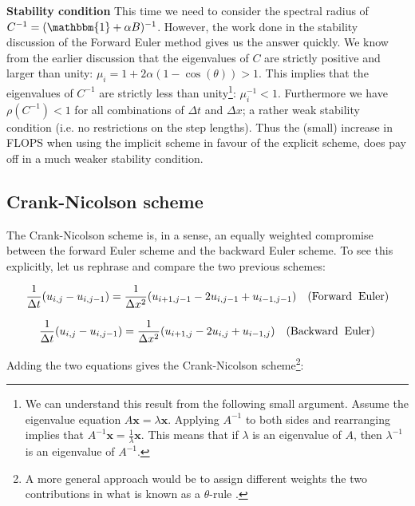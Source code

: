\documentclass[a4paper, 11pt, notitlepage,english]{article}
\newcommand{\id}{\mathbbm{1}}
\begin{document}
\textbf{Stability condition} \newline
This time we need to consider the spectral radius of $C^{-1} = (\id + \alpha B)^{-1}$. However, the work done in the stability discussion of the Forward Euler method gives us the answer quickly. We know from the earlier discussion that the eigenvalues of $C$ are strictly positive and larger than unity: $\mu_i = 1 + 2\alpha(1-\cos(\theta)) > 1$. This implies that the eigenvalues of $C^{-1}$ are strictly less than unity\footnote{We can understand this result from the following small argument. Assume the eigenvalue equation $A\boldsymbol{x} = \lambda \boldsymbol{x}$. Applying $A^{-1}$ to both sides and rearranging implies that $A^{-1}\boldsymbol{x} = \frac{1}{\lambda} \boldsymbol{x}$. This means that if $\lambda$ is an eigenvalue of $A$, then $\lambda^{-1}$ is an eigenvalue of $A^{-1}$.}: $\mu_i^{-1} < 1$. Furthermore we have $\rho(C^{-1}) < 1$ for all combinations of $\Delta t$ and $\Delta x$; a rather weak stability condition (i.e. no restrictions on the step lengths). Thus the (small) increase in FLOPS when using the implicit scheme in favour of the explicit scheme, does pay off in a much weaker stability condition.

\subsection{Crank-Nicolson scheme}
The Crank-Nicolson scheme is, in a sense, an equally weighted compromise between the forward Euler scheme and the backward Euler scheme. To see this explicitly, let us rephrase and compare the two previous schemes:

\begin{equation}
 \frac{1}{\Delta t} (u_{i,j}-u_{i,j-1}) = \frac{1}{\Delta x^2} (u_{i+1,j-1}-2u_{i,j-1}+u_{i-1,j-1}) \hspace{10pt} \mathrm{(Forward \hspace{2mm} Euler)}
\end{equation}

\begin{equation}
 \frac{1}{\Delta t} (u_{i,j}-u_{i,j-1}) = \frac{1}{\Delta x^2} (u_{i+1,j}-2u_{i,j}+u_{i-1,j}) \hspace{10pt} \mathrm{(Backward \hspace{2mm} Euler)}
\end{equation}

Adding the two equations gives the Crank-Nicolson scheme\footnote{A more general approach would be to assign different weights the two contributions in what is known as a $\theta$-rule \cite{Komp3150}.}:
\end{document}
